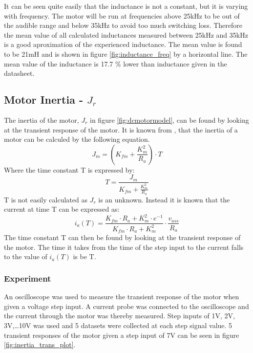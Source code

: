 It can be seen quite easily that the inductance is not a constant, but it is varying with frequency. 
The motor will be run at frequencies above 25kHz to be out of the audible range and below 35kHz to avoid too much switching loss. 
Therefore the mean value of all calculated inductances measured between 25kHz and 35kHz is a good aproximation of the experienced inductance.
The mean value is found to be 21mH and is shown in figure \ref{fig:inductance_freq} by a horizontal line.
The mean value of the inductance is 17.7 $\%$ lower than inductance given in the datasheet.	

\subsection{Motor Inertia - $J_r$}
\label{sec:inertia}
The inertia of the motor, $J_r$ in figure \ref{fig:dcmotormodel}, can be found by looking at the transient response of the motor. 
It is known from \cite{feedback}, that the inertia of a motor can be calculed by the following equation.
$$J_m = (K_{fm}+\frac{K_m^2}{R_a}) \cdot T$$
Where the time constant T is expressed by:
$$ T = \frac{J_m}{K_{fm}+\frac{K_m^2}{R_a}}$$
T is not easily calculated as $J_r$ is an unknown. Instead it is known that the current at time T can be expressed as:
$$ i_a(T) = \frac{K_{fm} \cdot R_a + K_m^2 \cdot e^{-1}}{K_{fm} \cdot R_a + K_m^2} \cdot \frac{v_{ass}}{R_a} $$
The time constant T can then be found by looking at the transient response of the motor. 
The time it takes from the time of the step input to the current falls to the value of $i_a(T)$ is be T.

\subsubsection{Experiment}
An oscilloscope was used to measure the transient response of the motor when given a voltage step input. A current probe was connected to the oscilloscope and the current through the motor was thereby measured.
Step inputs of 1V, 2V, 3V,\dots 10V was used and 5 datasets were collected at each step signal value.  
5 transient responses of the motor given a step input of 7V can be seen in figure \ref{fig:inertia_trans_plot}.

